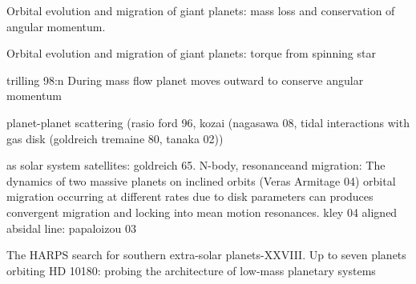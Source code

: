 

\begin{workout}
Orbital evolution and migration of giant planets: mass loss and conservation of angular momentum.
\end{workout}

\begin{workout}
Orbital evolution and migration of giant planets: torque from spinning star
\end{workout}

\begin{workout}
trilling 98:n During mass flow planet moves outward to conserve angular momentum
\end{workout}

\begin{workout}
planet-planet scattering (rasio ford 96, kozai (nagasawa 08, tidal interactions with gas disk (goldreich tremaine 80, tanaka 02))
\end{workout}

\begin{workout}
as solar system satellites: goldreich 65.
N-body, resonanceand migration: The dynamics of two massive planets on inclined orbits (Veras Armitage 04)
orbital migration occurring at different rates due to disk parameters can produces convergent migration and locking into mean motion resonances.
kley 04
aligned absidal line: papaloizou 03
\end{workout}




\begin{workout}
The HARPS search for southern extra-solar planets-XXVIII. Up to seven planets orbiting HD 10180: probing the architecture of low-mass planetary systems
\end{workout}

